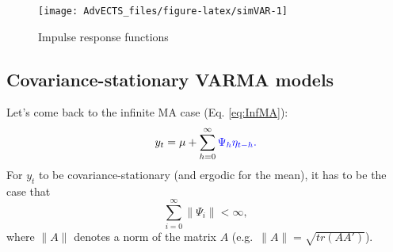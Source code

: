 \documentclass[
]{book}
\newenvironment{Shaded}{\begin{snugshade}}{\end{snugshade}}
\newcommand{\AttributeTok}[1]{\textcolor[rgb]{0.77,0.63,0.00}{#1}}
\newcommand{\DecValTok}[1]{\textcolor[rgb]{0.00,0.00,0.81}{#1}}
\newcommand{\FloatTok}[1]{\textcolor[rgb]{0.00,0.00,0.81}{#1}}
\newcommand{\FunctionTok}[1]{\textcolor[rgb]{0.00,0.00,0.00}{#1}}
\newcommand{\NormalTok}[1]{#1}
\newcommand{\SpecialCharTok}[1]{\textcolor[rgb]{0.00,0.00,0.00}{#1}}
\newcommand{\StringTok}[1]{\textcolor[rgb]{0.31,0.60,0.02}{#1}}
\theoremstyle{definition}
\theoremstyle{definition}
\theoremstyle{definition}
\theoremstyle{definition}
\theoremstyle{remark}
\begin{document}
\begin{Shaded}
\end{Shaded}

\begin{figure}
\texttt{[image: AdvECTS\_files/figure-latex/simVAR-1]} \caption{Impulse response functions}\label{fig:simVAR}
\end{figure}

\hypertarget{covariance-stationary-varma-models}{%
\subsection{Covariance-stationary VARMA models}\label{covariance-stationary-varma-models}}

Let's come back to the infinite MA case (Eq. \eqref{eq:InfMA}):
\[
y_t = \mu + \sum_{h=0}^\infty \color{blue}{\Psi_{h}} \eta_{t-h}.
\]
For \(y_t\) to be covariance-stationary (and ergodic for the mean), it has to be the case that
\begin{equation}
\sum_{i=0}^\infty \|\Psi_i\| < \infty,\label{eq:condiInfiniteMA}
\end{equation}
where \(\|A\|\) denotes a norm of the matrix \(A\) (e.g.~\(\|A\|=\sqrt{tr(AA')}\)).
\end{document}
